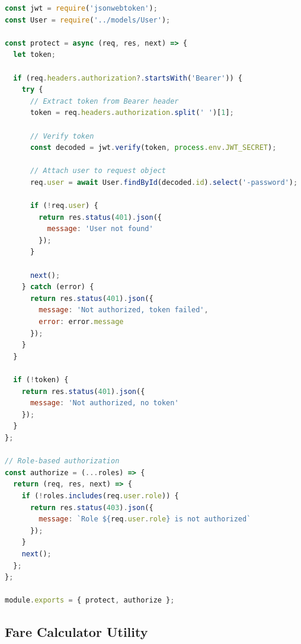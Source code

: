 \documentclass[12pt,a4paper]{article}
\begin{document}
\begin{lstlisting}[language=JavaScript, caption=Token Verification Middleware]
const jwt = require('jsonwebtoken');
const User = require('../models/User');

const protect = async (req, res, next) => {
  let token;
  
  if (req.headers.authorization?.startsWith('Bearer')) {
    try {
      // Extract token from Bearer header
      token = req.headers.authorization.split(' ')[1];
      
      // Verify token
      const decoded = jwt.verify(token, process.env.JWT_SECRET);
      
      // Attach user to request object
      req.user = await User.findById(decoded.id).select('-password');
      
      if (!req.user) {
        return res.status(401).json({ 
          message: 'User not found' 
        });
      }
      
      next();
    } catch (error) {
      return res.status(401).json({ 
        message: 'Not authorized, token failed',
        error: error.message 
      });
    }
  }
  
  if (!token) {
    return res.status(401).json({ 
      message: 'Not authorized, no token' 
    });
  }
};

// Role-based authorization
const authorize = (...roles) => {
  return (req, res, next) => {
    if (!roles.includes(req.user.role)) {
      return res.status(403).json({
        message: `Role ${req.user.role} is not authorized`
      });
    }
    next();
  };
};

module.exports = { protect, authorize };
\end{lstlisting}

\subsection{Fare Calculator Utility}
\end{document}
